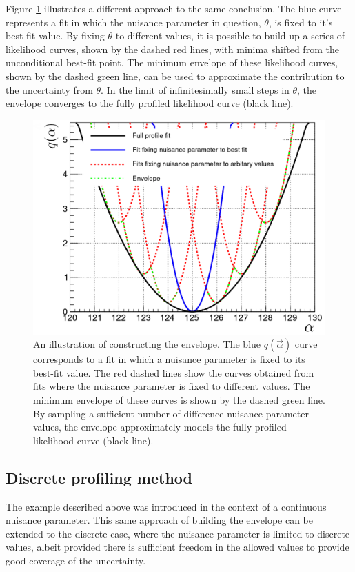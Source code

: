 Figure \ref{fig:nuisance_illustration} illustrates a different approach to the same conclusion. The blue curve represents a fit in which the nuisance parameter in question, $\theta$, is fixed to it's best-fit value. By fixing $\theta$ to different values, it is possible to build up a series of likelihood curves, shown by the dashed red lines, with minima shifted from the unconditional best-fit point. The minimum envelope of these likelihood curves, shown by the dashed green line, can be used to approximate the contribution to the uncertainty from $\theta$. In the limit of infinitesimally small steps in $\theta$, the envelope converges to the fully profiled likelihood curve (black line).

\begin{figure}[hptb]
  \centering
  \includegraphics[width=.6\textwidth]{Figures/hgg_stats/nuisance_illustration.pdf}
  \caption[Constructing the envelope]
  {
    An illustration of constructing the envelope. The blue $q(\vec{\alpha})$ curve corresponds to a fit in which a nuisance parameter is fixed to its best-fit value. The red dashed lines show the curves obtained from fits where the nuisance parameter is fixed to different values. The minimum envelope of these curves is shown by the dashed green line. By sampling a sufficient number of difference nuisance parameter values, the envelope approximately models the fully profiled likelihood curve (black line).
  }
  \label{fig:nuisance_illustration}
\end{figure}

\subsection{Discrete profiling method}
The example described above was introduced in the context of a continuous nuisance parameter. This same approach of building the envelope can be extended to the discrete case, where the nuisance parameter is limited to discrete values, albeit provided there is sufficient freedom in the allowed values to provide good coverage of the uncertainty.

